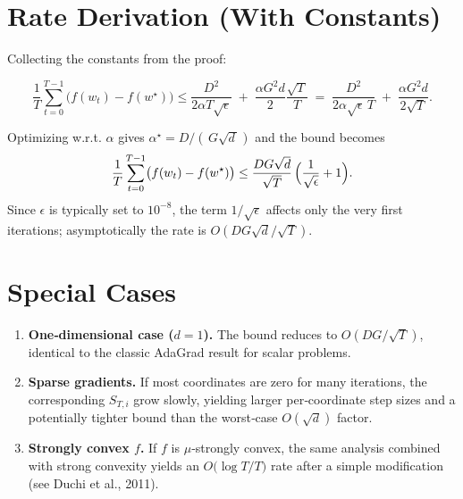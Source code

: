 \documentclass{article}
\begin{document}
\section*{Rate Derivation (With Constants)}
Collecting the constants from the proof:

\[
\boxed{
\frac{1}{T}\sum_{t=0}^{T-1}\bigl(f(w_t)-f(w^{\star})\bigr)
\le
\frac{D^2}{2\alpha T\sqrt{\epsilon}}
\;+\;
\frac{\alpha G^2 d}{2}\frac{\sqrt{T}}{T}
\;=\;
\frac{D^2}{2\alpha\sqrt{\epsilon}\,T}
\;+\;
\frac{\alpha G^2 d}{2\sqrt{T}} .
}
\]

Optimizing w.r.t. $\alpha$ gives $\alpha^{\star}= D/(\,G\sqrt{d\,})$ and
the bound becomes
\[
\frac{1}{T}\sum_{t=0}^{T-1}\bigl(f(w_t)-f(w^{\star})\bigr)
\le
\frac{DG\sqrt{d}}{\sqrt{T}}\,\Bigl(\frac{1}{\sqrt{\epsilon}}+1\Bigr).
\]
Since $\epsilon$ is typically set to $10^{-8}$, the term $1/\sqrt{\epsilon}$
affects only the very first iterations; asymptotically the rate is
$O(DG\sqrt{d}/\sqrt{T})$.

\section*{Special Cases}
\begin{enumerate}
\item \textbf{One‑dimensional case ($d=1$).}
The bound reduces to $O(DG/\sqrt{T})$, identical to the classic
AdaGrad result for scalar problems.
\item \textbf{Sparse gradients.}
If most coordinates are zero for many iterations, the corresponding
$S_{T,i}$ grow slowly, yielding larger per‑coordinate step sizes and a
potentially tighter bound than the worst‑case $O(\sqrt{d})$ factor.
\item \textbf{Strongly convex $f$.}
If $f$ is $\mu$‑strongly convex, the same analysis combined with
strong convexity yields an $O\bigl(\log T / T\bigr)$ rate after a
simple modification (see Duchi et al., 2011).
\end{enumerate}
\end{document}
